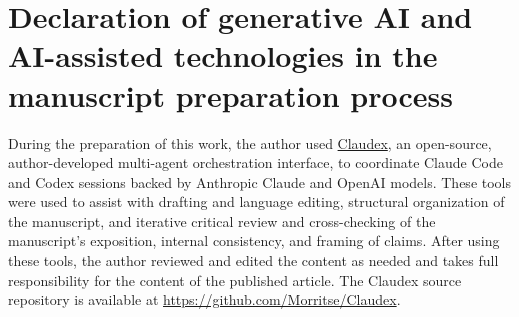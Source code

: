 \documentclass[11pt]{article}
\begin{document}
\section*{Declaration of generative AI and AI-assisted technologies in the manuscript preparation process}

During the preparation of this work, the author used
\href{https://github.com/Morritse/Claudex}{Claudex}, an open-source,
author-developed multi-agent orchestration interface, to coordinate Claude Code
and Codex sessions backed by Anthropic Claude and OpenAI models. These tools
were used to assist with drafting and language editing, structural organization
of the manuscript, and iterative critical review and cross-checking of the
manuscript's exposition, internal consistency, and framing of claims. After
using these tools, the author reviewed and edited the content as needed and
takes full responsibility for the content of the published article. The Claudex
source repository is available at \url{https://github.com/Morritse/Claudex}.
\end{document}
